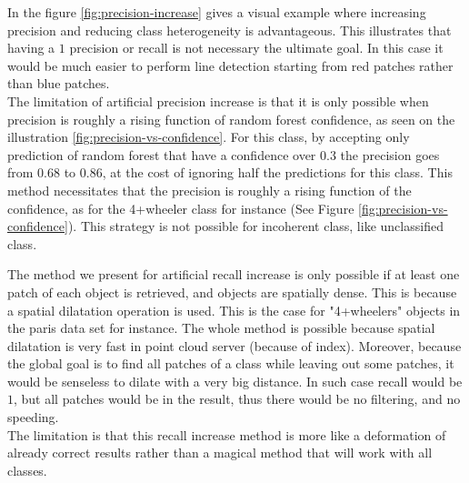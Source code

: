 		In the figure \ref{fig:precision-increase} gives a visual example where increasing precision and reducing class heterogeneity is advantageous. This illustrates that having a $1$ precision or recall is not necessary the ultimate goal.
		In this case it would be much easier to perform line detection starting from red patches rather than blue patches.
		\\
		The limitation of artificial precision increase is 
		that it is only possible when precision is roughly a rising function of random forest confidence, as seen on the illustration \ref{fig:precision-vs-confidence}.
		For this class, by accepting only prediction of random forest that have a confidence over $0.3$ the precision goes from $0.68$ to $0.86$, at the cost of ignoring half the predictions for this class.
		This method necessitates that the precision is roughly a rising function of the confidence, as for the 4+wheeler class for instance (See Figure \ref{fig:precision-vs-confidence}).   
		This strategy is not possible for incoherent class, like unclassified class.

		The method we present for artificial recall increase is only possible if at least one patch of each object is retrieved, and objects are spatially dense.
		This is because a spatial dilatation operation is used.
		This is the case for "4+wheelers" objects in the paris data set for instance.
		The whole method is possible because spatial dilatation is very fast in point cloud server (because of index).
		Moreover, because the global goal is to find all patches of a class while leaving out some patches,
		it would be senseless to dilate with a very big distance.
		In such case recall would be $1$, but all patches would be in the result, thus there would be no filtering, and no speeding.
		\\
		The limitation is that this recall increase method is more like a deformation of already correct results 
		rather than a magical method that will work with all classes.
				